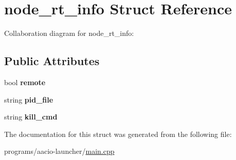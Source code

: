 \hypertarget{structnode__rt__info}{}\section{node\+\_\+rt\+\_\+info Struct Reference}
\label{structnode__rt__info}


Collaboration diagram for node\+\_\+rt\+\_\+info\+:
\subsection*{Public Attributes}
\begin{DoxyCompactItemize}
\item 
\mbox{\label{structnode__rt__info_a0af67e370e7ad0e16f46b6cf191130be}} 
bool {\bfseries remote}
\item 
\mbox{\label{structnode__rt__info_a1ad1afe899f3090698512811f7e2710c}} 
string {\bfseries pid\+\_\+file}
\item 
\mbox{\label{structnode__rt__info_ac7ec4ed8e13c084d63b884b17c18c45c}} 
string {\bfseries kill\+\_\+cmd}
\end{DoxyCompactItemize}


The documentation for this struct was generated from the following file\+:\begin{DoxyCompactItemize}
\item 
programs/aacio-\/launcher/\mbox{\hyperlink{programs_2aacio-launcher_2main_8cpp}{main.\+cpp}}\end{DoxyCompactItemize}
